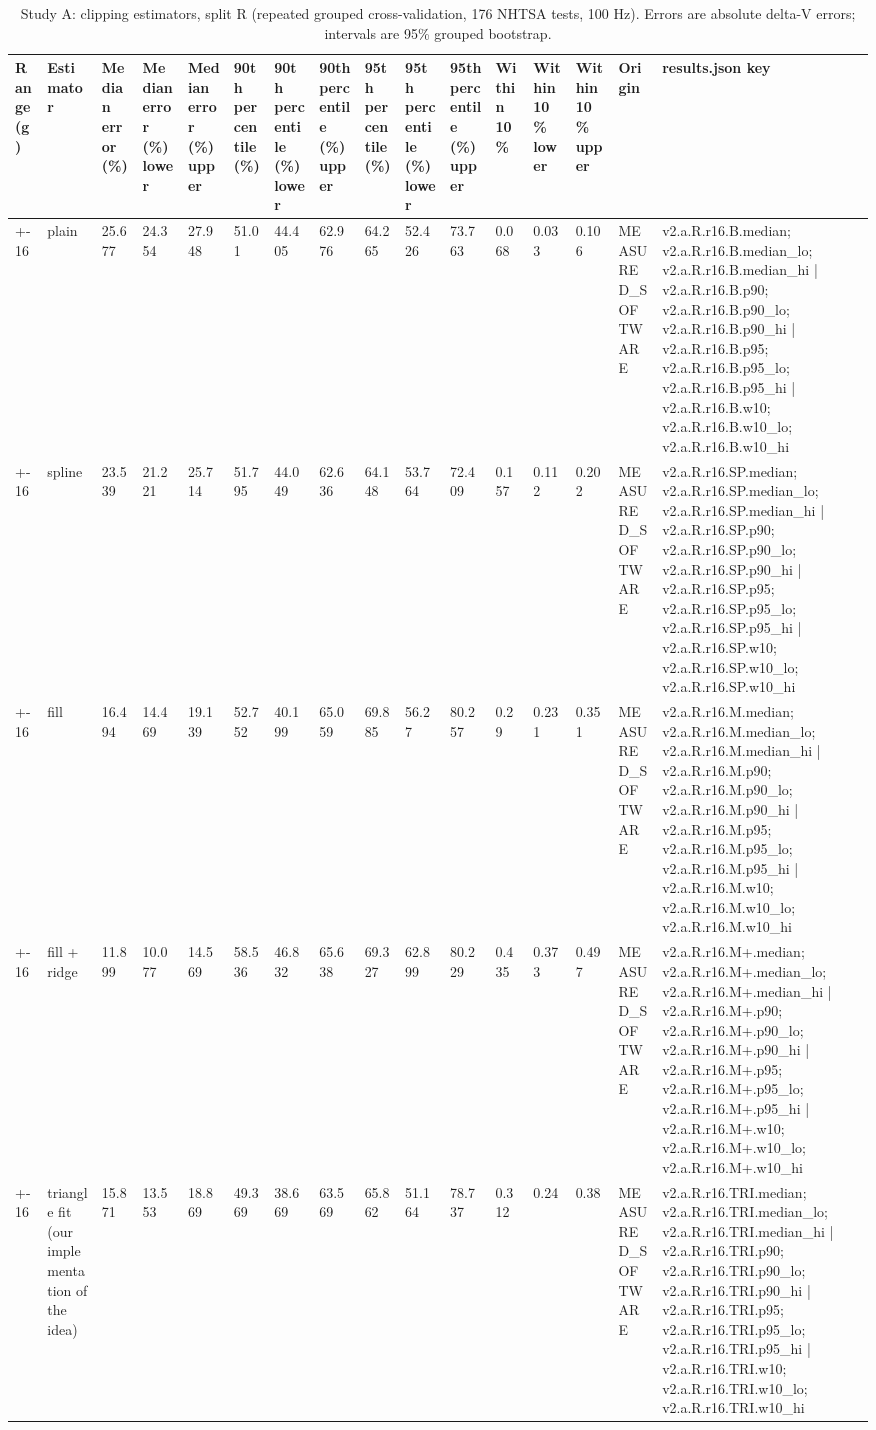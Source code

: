 \begin{table}[t]
\centering
\small
\caption{Study A: clipping estimators, split R (repeated grouped cross-validation, 176 NHTSA tests, 100 Hz). Errors are absolute delta-V errors; intervals are 95\% grouped bootstrap.}
\label{tab:v2_tab_estimators}
\begin{tabular}{llllllllllllllll}
\toprule
Range (g) & Estimator & Median error (\%) & Median error (\%) lower & Median error (\%) upper & 90th percentile (\%) & 90th percentile (\%) lower & 90th percentile (\%) upper & 95th percentile (\%) & 95th percentile (\%) lower & 95th percentile (\%) upper & Within 10\% & Within 10\% lower & Within 10\% upper & Origin & results.json key \\
\midrule
+-16 & plain & 25.677 & 24.354 & 27.948 & 51.01 & 44.405 & 62.976 & 64.265 & 52.426 & 73.763 & 0.068 & 0.033 & 0.106 & MEASURED\_SOFTWARE & v2.a.R.r16.B.median; v2.a.R.r16.B.median\_lo; v2.a.R.r16.B.median\_hi | v2.a.R.r16.B.p90; v2.a.R.r16.B.p90\_lo; v2.a.R.r16.B.p90\_hi | v2.a.R.r16.B.p95; v2.a.R.r16.B.p95\_lo; v2.a.R.r16.B.p95\_hi | v2.a.R.r16.B.w10; v2.a.R.r16.B.w10\_lo; v2.a.R.r16.B.w10\_hi \\
+-16 & spline & 23.539 & 21.221 & 25.714 & 51.795 & 44.049 & 62.636 & 64.148 & 53.764 & 72.409 & 0.157 & 0.112 & 0.202 & MEASURED\_SOFTWARE & v2.a.R.r16.SP.median; v2.a.R.r16.SP.median\_lo; v2.a.R.r16.SP.median\_hi | v2.a.R.r16.SP.p90; v2.a.R.r16.SP.p90\_lo; v2.a.R.r16.SP.p90\_hi | v2.a.R.r16.SP.p95; v2.a.R.r16.SP.p95\_lo; v2.a.R.r16.SP.p95\_hi | v2.a.R.r16.SP.w10; v2.a.R.r16.SP.w10\_lo; v2.a.R.r16.SP.w10\_hi \\
+-16 & fill & 16.494 & 14.469 & 19.139 & 52.752 & 40.199 & 65.059 & 69.885 & 56.27 & 80.257 & 0.29 & 0.231 & 0.351 & MEASURED\_SOFTWARE & v2.a.R.r16.M.median; v2.a.R.r16.M.median\_lo; v2.a.R.r16.M.median\_hi | v2.a.R.r16.M.p90; v2.a.R.r16.M.p90\_lo; v2.a.R.r16.M.p90\_hi | v2.a.R.r16.M.p95; v2.a.R.r16.M.p95\_lo; v2.a.R.r16.M.p95\_hi | v2.a.R.r16.M.w10; v2.a.R.r16.M.w10\_lo; v2.a.R.r16.M.w10\_hi \\
+-16 & fill + ridge & 11.899 & 10.077 & 14.569 & 58.536 & 46.832 & 65.638 & 69.327 & 62.899 & 80.229 & 0.435 & 0.373 & 0.497 & MEASURED\_SOFTWARE & v2.a.R.r16.M+.median; v2.a.R.r16.M+.median\_lo; v2.a.R.r16.M+.median\_hi | v2.a.R.r16.M+.p90; v2.a.R.r16.M+.p90\_lo; v2.a.R.r16.M+.p90\_hi | v2.a.R.r16.M+.p95; v2.a.R.r16.M+.p95\_lo; v2.a.R.r16.M+.p95\_hi | v2.a.R.r16.M+.w10; v2.a.R.r16.M+.w10\_lo; v2.a.R.r16.M+.w10\_hi \\
+-16 & triangle fit (our implementation of the idea) & 15.871 & 13.553 & 18.869 & 49.369 & 38.669 & 63.569 & 65.862 & 51.164 & 78.737 & 0.312 & 0.24 & 0.38 & MEASURED\_SOFTWARE & v2.a.R.r16.TRI.median; v2.a.R.r16.TRI.median\_lo; v2.a.R.r16.TRI.median\_hi | v2.a.R.r16.TRI.p90; v2.a.R.r16.TRI.p90\_lo; v2.a.R.r16.TRI.p90\_hi | v2.a.R.r16.TRI.p95; v2.a.R.r16.TRI.p95\_lo; v2.a.R.r16.TRI.p95\_hi | v2.a.R.r16.TRI.w10; v2.a.R.r16.TRI.w10\_lo; v2.a.R.r16.TRI.w10\_hi \\

\end{tabular}
\end{table}
